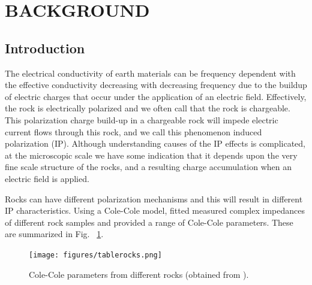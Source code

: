 \documentclass[letterpaper,11pt]{article}
\title{\normalsize}
\begin{document}

\newpage

\tableofcontents
\newpage





\section{BACKGROUND}

\subsection{Introduction}
The electrical conductivity of earth materials can be frequency dependent with the effective conductivity decreasing with decreasing frequency due to the buildup of electric charges that occur under the application of an electric field. Effectively, the rock is electrically polarized and we often call that the rock is chargeable. This polarization charge build-up in a chargeable rock will impede electric current flows through this rock, and we call this phenomenon induced polarization (IP). Although understanding causes of the IP effects is complicated, at the microscopic scale we have some indication that it depends upon the very fine scale structure of the rocks, and a resulting charge accumulation when an electric field is applied.

Rocks can have different polarization mechanisms and this will result in different IP characteristics. Using a Cole-Cole model, \cite{Pelton1978} fitted measured complex impedances of different rock samples and provided a range of Cole-Cole parameters. These are summarized in  Fig. ~\ref{Fig:tablerocks}. 

\begin{figure}[htb]
  \centering
  \texttt{[image: figures/tablerocks.png]}
  \caption{Cole-Cole parameters from different rocks (obtained from \cite{Pelton1978}).}
  \label{Fig:tablerocks}
\end{figure}
\end{document}
